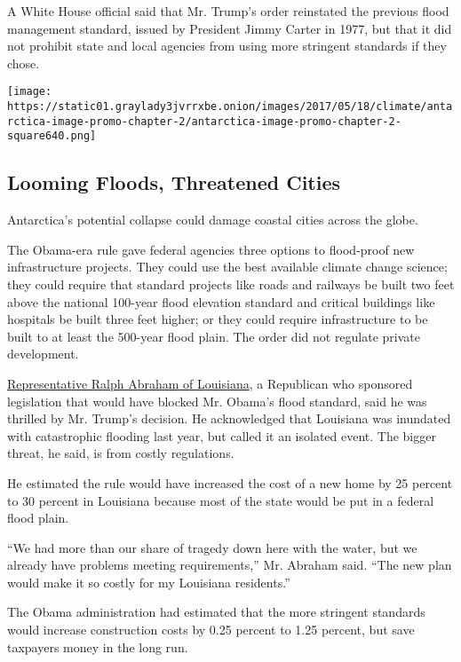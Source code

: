 A White House official said that Mr. Trump's order reinstated the
previous flood management standard, issued by President Jimmy Carter in
1977, but that it did not prohibit state and local agencies from using
more stringent standards if they chose.

\href{https://www.nytimes3xbfgragh.onion/interactive/2017/05/18/climate/antarctica-ice-melt-climate-change-flood.html}{}

\texttt{[image: https://static01.graylady3jvrrxbe.onion/images/2017/05/18/climate/antarctica-image-promo-chapter-2/antarctica-image-promo-chapter-2-square640.png]}

\hypertarget{looming-floods-threatened-cities}{%
\subsection{Looming Floods, Threatened
Cities}\label{looming-floods-threatened-cities}}

Antarctica's potential collapse could damage coastal cities across the
globe.

The Obama-era rule gave federal agencies three options to flood-proof
new infrastructure projects. They could use the best available climate
change science; they could require that standard projects like roads and
railways be built two feet above the national 100-year flood elevation
standard and critical buildings like hospitals be built three feet
higher; or they could require infrastructure to be built to at least the
500-year flood plain. The order did not regulate private development.

\href{https://abraham.house.gov/}{Representative Ralph Abraham of
Louisiana}, a Republican who sponsored legislation that would have
blocked Mr. Obama's flood standard, said he was thrilled by Mr. Trump's
decision. He acknowledged that Louisiana was inundated with catastrophic
flooding last year, but called it an isolated event. The bigger threat,
he said, is from costly regulations.

He estimated the rule would have increased the cost of a new home by 25
percent to 30 percent in Louisiana because most of the state would be
put in a federal flood plain.

``We had more than our share of tragedy down here with the water, but we
already have problems meeting requirements,'' Mr. Abraham said. ``The
new plan would make it so costly for my Louisiana residents.''

The Obama administration had estimated that the more stringent standards
would increase construction costs by 0.25 percent to 1.25 percent, but
save taxpayers money in the long run.

